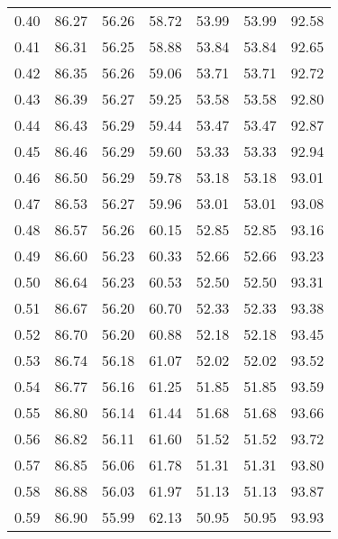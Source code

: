 \begin{tabular}{|c|c|c|c|c|c|c|}
      0.40 &     86.27 &     56.26 &      58.72 &   53.99 &      53.99 &         92.58 \\
      0.41 &     86.31 &     56.25 &      58.88 &   53.84 &      53.84 &         92.65 \\
      0.42 &     86.35 &     56.26 &      59.06 &   53.71 &      53.71 &         92.72 \\
      0.43 &     86.39 &     56.27 &      59.25 &   53.58 &      53.58 &         92.80 \\
      0.44 &     86.43 &     56.29 &      59.44 &   53.47 &      53.47 &         92.87 \\
      0.45 &     86.46 &     56.29 &      59.60 &   53.33 &      53.33 &         92.94 \\
      0.46 &     86.50 &     56.29 &      59.78 &   53.18 &      53.18 &         93.01 \\
      0.47 &     86.53 &     56.27 &      59.96 &   53.01 &      53.01 &         93.08 \\
      0.48 &     86.57 &     56.26 &      60.15 &   52.85 &      52.85 &         93.16 \\
      0.49 &     86.60 &     56.23 &      60.33 &   52.66 &      52.66 &         93.23 \\
      0.50 &     86.64 &     56.23 &      60.53 &   52.50 &      52.50 &         93.31 \\
      0.51 &     86.67 &     56.20 &      60.70 &   52.33 &      52.33 &         93.38 \\
      0.52 &     86.70 &     56.20 &      60.88 &   52.18 &      52.18 &         93.45 \\
      0.53 &     86.74 &     56.18 &      61.07 &   52.02 &      52.02 &         93.52 \\
      0.54 &     86.77 &     56.16 &      61.25 &   51.85 &      51.85 &         93.59 \\
      0.55 &     86.80 &     56.14 &      61.44 &   51.68 &      51.68 &         93.66 \\
      0.56 &     86.82 &     56.11 &      61.60 &   51.52 &      51.52 &         93.72 \\
      0.57 &     86.85 &     56.06 &      61.78 &   51.31 &      51.31 &         93.80 \\
      0.58 &     86.88 &     56.03 &      61.97 &   51.13 &      51.13 &         93.87 \\
      0.59 &     86.90 &     55.99 &      62.13 &   50.95 &      50.95 &         93.93 \\

\end{tabular}
